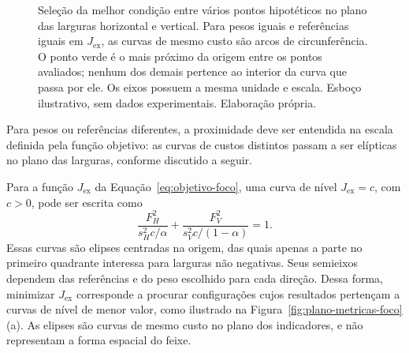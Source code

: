 \documentclass[12pt,a4paper]{article}
\begin{document}
\begin{figure}[htbp]
    \centering
    \caption{Seleção da melhor condição entre vários pontos hipotéticos no plano das larguras horizontal e vertical. Para pesos iguais e referências iguais em $J_{\mathrm{ex}}$, as curvas de mesmo custo são arcos de circunferência. O ponto verde é o mais próximo da origem entre os pontos avaliados; nenhum dos demais pertence ao interior da curva que passa por ele. Os eixos possuem a mesma unidade e escala. Esboço ilustrativo, sem dados experimentais. Elaboração própria.}
    \label{fig:melhor-ponto-foco}
\end{figure}

Para pesos ou referências diferentes, a proximidade deve ser entendida na escala definida pela função objetivo: as curvas de custos distintos passam a ser elípticas no plano das larguras, conforme discutido a seguir.

Para a função $J_{\mathrm{ex}}$ da Equação~\ref{eq:objetivo-foco}, uma curva de nível $J_{\mathrm{ex}}=c$, com $c>0$, pode ser escrita como
\begin{equation}
    \frac{F_H^2}{s_H^2c/\alpha}+
    \frac{F_V^2}{s_V^2c/(1-\alpha)}=1.
    \label{eq:elipses-objetivo}
\end{equation}
Essas curvas são elipses centradas na origem, das quais apenas a parte no primeiro quadrante interessa para larguras não negativas. Seus semieixos dependem das referências e do peso escolhido para cada direção. Dessa forma, minimizar $J_{\mathrm{ex}}$ corresponde a procurar configurações cujos resultados pertençam a curvas de nível de menor valor, como ilustrado na Figura~\ref{fig:plano-metricas-foco}(a). As elipses são curvas de mesmo custo no plano dos indicadores, e não representam a forma espacial do feixe.
\end{document}
